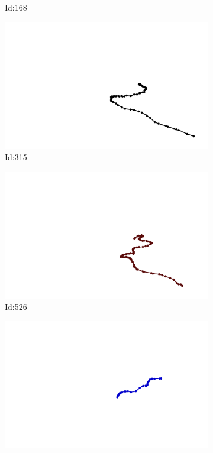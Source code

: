\documentclass[12pt,twoside]{report}
\begin{document}
\begin{figure}
\begin{subfigure}[b]{0.20\textwidth}
\caption{Id:168}
\end{subfigure}
\begin{subfigure}[b]{0.20\textwidth}
\centering
\includegraphics[width=\textwidth]{../../trajectories/315.png}
\caption{Id:315}
\end{subfigure}
\begin{subfigure}[b]{0.20\textwidth}
\centering
\includegraphics[width=\textwidth]{../../trajectories/526.png}
\caption{Id:526}
\end{subfigure}
\begin{subfigure}[b]{0.20\textwidth}
\centering
\includegraphics[width=\textwidth]{../../trajectories/567.png}

\end{subfigure}
\end{figure}
\end{document}
